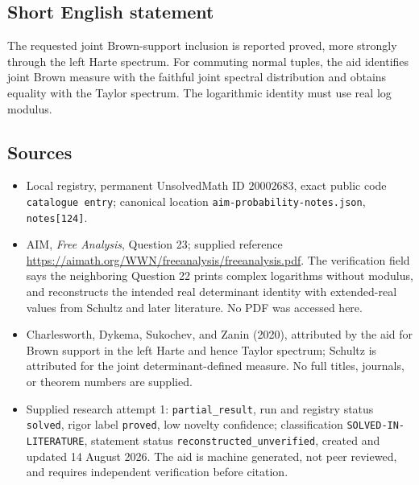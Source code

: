 \documentclass[11pt]{article}
\begin{document}
\subsection{Short English statement}
The requested joint Brown-support inclusion is reported proved, more strongly through the left Harte spectrum. For commuting normal tuples, the aid identifies joint Brown measure with the faithful joint spectral distribution and obtains equality with the Taylor spectrum. The logarithmic identity must use real log modulus.
\subsection{Sources}
\begin{itemize}
\item Local registry, permanent UnsolvedMath ID \(20002683\), exact public code \texttt{catalogue entry}; canonical location \texttt{aim-probability-notes.json}, \texttt{notes[124]}.
\item AIM, \emph{Free Analysis}, Question 23; supplied reference \url{https://aimath.org/WWN/freeanalysis/freeanalysis.pdf}. The verification field says the neighboring Question 22 prints complex logarithms without modulus, and reconstructs the intended real determinant identity with extended-real values from Schultz and later literature. No PDF was accessed here.
\item Charlesworth, Dykema, Sukochev, and Zanin (2020), attributed by the aid for Brown support in the left Harte and hence Taylor spectrum; Schultz is attributed for the joint determinant-defined measure. No full titles, journals, or theorem numbers are supplied.
\item Supplied research attempt 1: \texttt{partial\_result}, run and registry status \texttt{solved}, rigor label \texttt{proved}, low novelty confidence; classification \texttt{SOLVED-IN-LITERATURE}, statement status \texttt{reconstructed\_unverified}, created and updated 14 August 2026. The aid is machine generated, not peer reviewed, and requires independent verification before citation.
\end{itemize}
\end{document}
